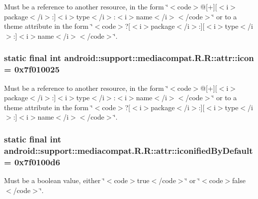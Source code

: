 Must be a reference to another resource, in the form \char`\"{}$<$code$>$@\mbox{[}+\mbox{]}\mbox{[}$<$i$>$package$<$/i$>$:\mbox{]}$<$i$>$type$<$/i$>$:$<$i$>$name$<$/i$>$$<$/code$>$\char`\"{} or to a theme attribute in the form \char`\"{}$<$code$>$?\mbox{[}$<$i$>$package$<$/i$>$:\mbox{]}\mbox{[}$<$i$>$type$<$/i$>$:\mbox{]}$<$i$>$name$<$/i$>$$<$/code$>$\char`\"{}. \hypertarget{classandroid_1_1support_1_1mediacompat_1_1_r_1_1attr_1a91f8bd41a9574aef956b700e3a04e3}{
\subsubsection[{icon}]{\setlength{\rightskip}{0pt plus 5cm}static final int android::support::mediacompat.R.R::attr::icon = 0x7f010025}}
\label{classandroid_1_1support_1_1mediacompat_1_1_r_1_1attr_1a91f8bd41a9574aef956b700e3a04e3}


Must be a reference to another resource, in the form \char`\"{}$<$code$>$@\mbox{[}+\mbox{]}\mbox{[}$<$i$>$package$<$/i$>$:\mbox{]}$<$i$>$type$<$/i$>$:$<$i$>$name$<$/i$>$$<$/code$>$\char`\"{} or to a theme attribute in the form \char`\"{}$<$code$>$?\mbox{[}$<$i$>$package$<$/i$>$:\mbox{]}\mbox{[}$<$i$>$type$<$/i$>$:\mbox{]}$<$i$>$name$<$/i$>$$<$/code$>$\char`\"{}. \hypertarget{classandroid_1_1support_1_1mediacompat_1_1_r_1_1attr_edc52917aad9976f4e93fec41505ec85}{
\subsubsection[{iconifiedByDefault}]{\setlength{\rightskip}{0pt plus 5cm}static final int android::support::mediacompat.R.R::attr::iconifiedByDefault = 0x7f0100d6}}
\label{classandroid_1_1support_1_1mediacompat_1_1_r_1_1attr_edc52917aad9976f4e93fec41505ec85}


Must be a boolean value, either \char`\"{}$<$code$>$true$<$/code$>$\char`\"{} or \char`\"{}$<$code$>$false$<$/code$>$\char`\"{}. 


